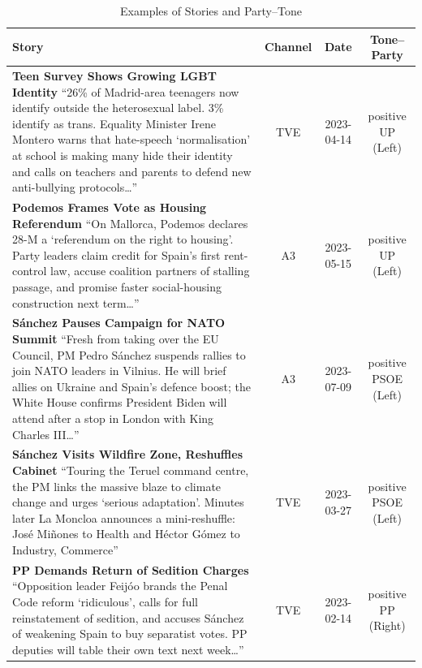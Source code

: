 \documentclass[12pt]{article}
\begin{document}
\begin{longtable}{|p{8cm}|c|c|c|}
	\caption{Examples of Stories and Party–Tone} \\
	\hline
	\textbf{Story} & \textbf{Channel} & \textbf{Date} & \textbf{Tone–Party}\\
	\hline
	\textbf{Teen Survey Shows Growing LGBT Identity}\newline
	{\scriptsize
		“26\% of Madrid-area teenagers now identify outside the heterosexual label. 3\% identify as trans.  
		Equality Minister Irene Montero warns that hate-speech ‘normalisation’ at school is making many hide their identity and calls on teachers and parents to defend new anti-bullying protocols…”}
	& TVE & 2023-04-14 & positive UP (Left)\\
	\hline
	\textbf{Podemos Frames Vote as Housing Referendum}\newline
	{\scriptsize
		“On Mallorca, Podemos declares 28-M a ‘referendum on the right to housing’.  
		Party leaders claim credit for Spain’s first rent-control law, accuse coalition partners of stalling passage, and promise faster social-housing construction next term…”}
	& A3 & 2023-05-15 & positive UP (Left)\\
	\hline
	\textbf{Sánchez Pauses Campaign for NATO Summit}\newline
	{\scriptsize
		“Fresh from taking over the EU Council, PM Pedro Sánchez suspends rallies to join NATO leaders in Vilnius.  
		He will brief allies on Ukraine and Spain’s defence boost; the White House confirms President Biden will attend after a stop in London with King Charles III…”}
	& A3 & 2023-07-09 & positive PSOE (Left)\\
	\hline
	\textbf{Sánchez Visits Wildfire Zone, Reshuffles Cabinet}\newline
	{\scriptsize
		“Touring the Teruel command centre, the PM links the massive blaze to climate change and urges ‘serious adaptation’.  
		Minutes later La Moncloa announces a mini-reshuffle: José Miñones to Health and Héctor Gómez to Industry, Commerce”}
	& TVE & 2023-03-27 & positive PSOE (Left)\\
	\hline
	\textbf{PP Demands Return of Sedition Charges}\newline
	{\scriptsize
		“Opposition leader Feijóo brands the Penal Code reform ‘ridiculous’, calls for full reinstatement of sedition, and accuses Sánchez of weakening Spain to buy separatist votes.  
		PP deputies will table their own text next week…”}
	& TVE & 2023-02-14 & positive PP (Right)\\

\end{longtable}
\end{document}
